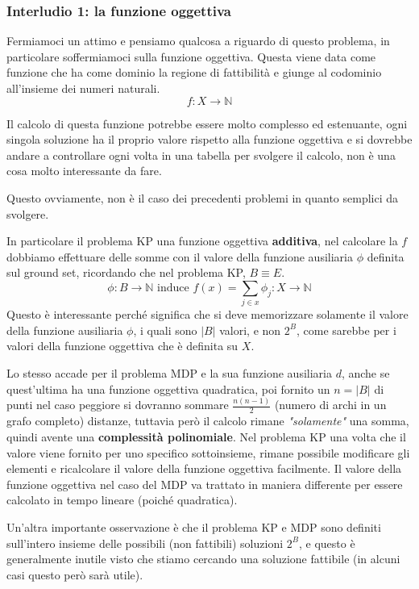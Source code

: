 \documentclass{article}
\begin{document}
\subsubsection{Interludio 1: la funzione oggettiva}
Fermiamoci un attimo e pensiamo qualcosa a riguardo di questo problema, in particolare soffermiamoci sulla funzione oggettiva.
Questa viene data come funzione che ha come dominio la regione di fattibilità e giunge al
codominio all'insieme dei numeri naturali.
$$f:X\rightarrow \mathbb{N}$$

Il calcolo di questa funzione potrebbe essere molto complesso ed estenuante, ogni singola soluzione ha il proprio valore rispetto alla funzione oggettiva
e si dovrebbe andare a controllare ogni volta in una tabella per svolgere il calcolo, non è una cosa molto interessante da fare.

Questo ovviamente, non è il caso dei precedenti problemi in quanto semplici da svolgere.

In particolare il problema KP una funzione oggettiva \textbf{additiva}, nel calcolare la $f$ dobbiamo effettuare delle somme
con il valore della funzione ausiliaria $\phi$ definita sul ground set, ricordando che nel problema KP, $B \equiv E$.
$$\phi : B\rightarrow \mathbb{N} \text{ induce } f(x)=\sum_{j\in x}\phi_j : X \rightarrow \mathbb{N}$$
Questo è interessante perché significa che si deve memorizzare solamente il valore della funzione ausiliaria $\phi$,
i quali sono $|B|$ valori, e non $2^B$, come sarebbe per i valori della funzione oggettiva che è definita su $X$.

Lo stesso accade per il problema MDP e la sua funzione ausiliaria $d$, anche se quest'ultima ha una funzione oggettiva quadratica,
poi fornito un $n=|B|$ di punti nel caso peggiore si dovranno sommare $\frac{n(n-1)}{2}$ (numero di archi in un grafo completo) distanze, tuttavia però il
calcolo rimane \textit{"solamente"} una somma, quindi avente una \textbf{complessità polinomiale}.
\newline
Nel problema KP una volta che il valore viene fornito per uno specifico sottoinsieme, rimane possibile modificare gli elementi
e ricalcolare il valore della funzione oggettiva facilmente. Il valore della funzione oggettiva nel caso del MDP va trattato in maniera differente
per essere calcolato in tempo lineare (poiché quadratica).

Un'altra importante osservazione è che il problema KP e MDP sono definiti sull'intero insieme delle possibili (non fattibili)
soluzioni $2^B$, e questo è generalmente inutile visto che stiamo cercando
una soluzione fattibile (in alcuni casi questo però sarà utile).
\end{document}
